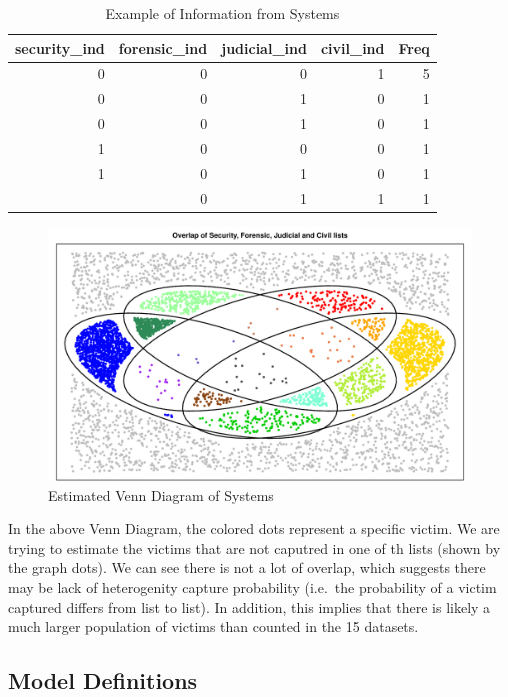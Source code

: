 \documentclass[]{article}
\begin{document}
\begin{table}[H]

\caption{\label{tab:adding-systems}Example of Information from Systems}
\centering
\begin{tabular}{rrrrr}
\toprule
security\_ind & forensic\_ind & judicial\_ind & civil\_ind & Freq\\
\midrule
0 & 0 & 0 & 1 & 5\\
0 & 0 & 1 & 0 & 1\\
0 & 0 & 1 & 0 & 1\\
1 & 0 & 0 & 0 & 1\\
1 & 0 & 1 & 0 & 1\\
\addlinespace
0 & 0 & 1 & 1 & 1\\
\bottomrule
\end{tabular}
\end{table}

\begin{figure}
\centering
\includegraphics{Categorical-FinalProject_files/figure-latex/systems.venndiagram-1.pdf}
\caption{Estimated Venn Diagram of Systems}
\end{figure}

In the above Venn Diagram, the colored dots represent a specific victim.
We are trying to estimate the victims that are not caputred in one of th
lists (shown by the graph dots). We can see there is not a lot of
overlap, which suggests there may be lack of heterogenity capture
probability (i.e.~the probability of a victim captured differs from list
to list). In addition, this implies that there is likely a much larger
population of victims than counted in the 15 datasets.

\hypertarget{model-definitions}{%
\subsection{Model Definitions}\label{model-definitions}}
\end{document}
